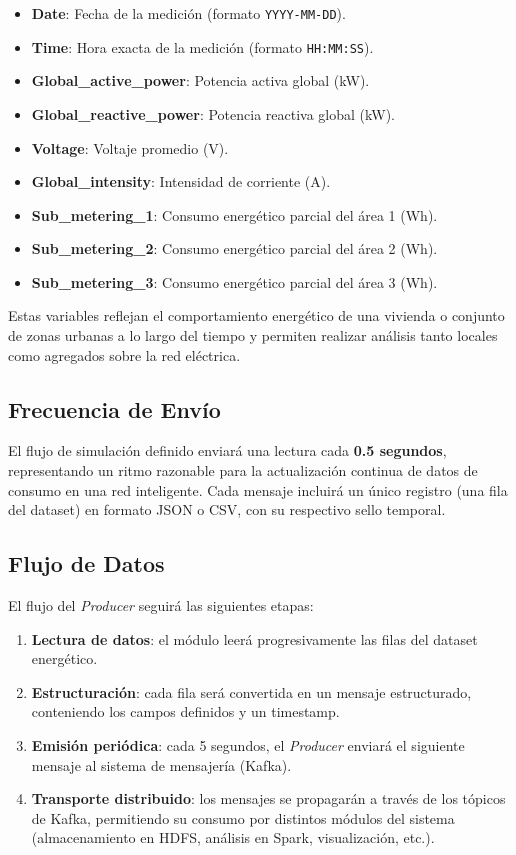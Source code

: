 \documentclass[12pt,a4paper]{article}
\begin{document}
\begin{itemize}
    \item \textbf{Date}: Fecha de la medición (formato \texttt{YYYY-MM-DD}).
    \item \textbf{Time}: Hora exacta de la medición (formato \texttt{HH:MM:SS}).
    \item \textbf{Global\_active\_power}: Potencia activa global (kW).
    \item \textbf{Global\_reactive\_power}: Potencia reactiva global (kW).
    \item \textbf{Voltage}: Voltaje promedio (V).
    \item \textbf{Global\_intensity}: Intensidad de corriente (A).
    \item \textbf{Sub\_metering\_1}: Consumo energético parcial del área 1 (Wh).
    \item \textbf{Sub\_metering\_2}: Consumo energético parcial del área 2 (Wh).
    \item \textbf{Sub\_metering\_3}: Consumo energético parcial del área 3 (Wh).
\end{itemize}

Estas variables reflejan el comportamiento energético de una vivienda o conjunto de zonas urbanas a lo largo del tiempo y permiten realizar análisis tanto locales como agregados sobre la red eléctrica.

\subsection{Frecuencia de Envío}
El flujo de simulación definido enviará una lectura cada \textbf{0.5 segundos}, representando un ritmo razonable para la actualización continua de datos de consumo en una red inteligente. Cada mensaje incluirá un único registro (una fila del dataset) en formato JSON o CSV, con su respectivo sello temporal.

\subsection{Flujo de Datos}
El flujo del \textit{Producer} seguirá las siguientes etapas:
\begin{enumerate}
    \item \textbf{Lectura de datos}: el módulo leerá progresivamente las filas del dataset energético.
    \item \textbf{Estructuración}: cada fila será convertida en un mensaje estructurado, conteniendo los campos definidos y un timestamp.
    \item \textbf{Emisión periódica}: cada 5 segundos, el \textit{Producer} enviará el siguiente mensaje al sistema de mensajería (Kafka).
    \item \textbf{Transporte distribuido}: los mensajes se propagarán a través de los tópicos de Kafka, permitiendo su consumo por distintos módulos del sistema (almacenamiento en HDFS, análisis en Spark, visualización, etc.).
\end{enumerate}
\end{document}
